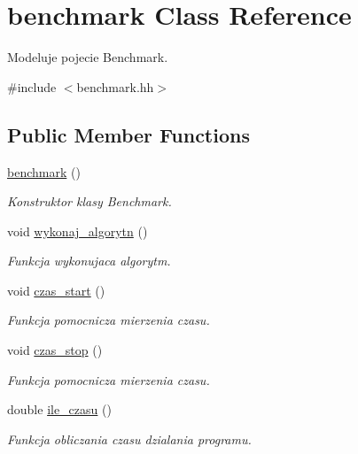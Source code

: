 \hypertarget{classbenchmark}{\section{benchmark Class Reference}
\label{classbenchmark}
}


Modeluje pojecie Benchmark.  




{\ttfamily \#include $<$benchmark.\-hh$>$}

\subsection*{Public Member Functions}
\begin{DoxyCompactItemize}
\item 
\hyperlink{classbenchmark_af56f1d9420c5c1ccc65e4f6aac54658d}{benchmark} ()
\begin{DoxyCompactList}\small\item\em Konstruktor klasy Benchmark. \end{DoxyCompactList}\item 
void \hyperlink{classbenchmark_aacae513e2f55669c83f37a07110f3989}{wykonaj\-\_\-algorytn} ()
\begin{DoxyCompactList}\small\item\em Funkcja wykonujaca algorytm. \end{DoxyCompactList}\item 
void \hyperlink{classbenchmark_a42ab532c49030406366e859f9b3f29f8}{czas\-\_\-start} ()
\begin{DoxyCompactList}\small\item\em Funkcja pomocnicza mierzenia czasu. \end{DoxyCompactList}\item 
void \hyperlink{classbenchmark_a9beb25d3e65b94c1ac7c085d8105fe65}{czas\-\_\-stop} ()
\begin{DoxyCompactList}\small\item\em Funkcja pomocnicza mierzenia czasu. \end{DoxyCompactList}\item 
double \hyperlink{classbenchmark_a613a8792feca7c2622355922d64d6fcd}{ile\-\_\-czasu} ()
\begin{DoxyCompactList}\small\item\em Funkcja obliczania czasu dzialania programu. \end{DoxyCompactList}\end{DoxyCompactItemize}
